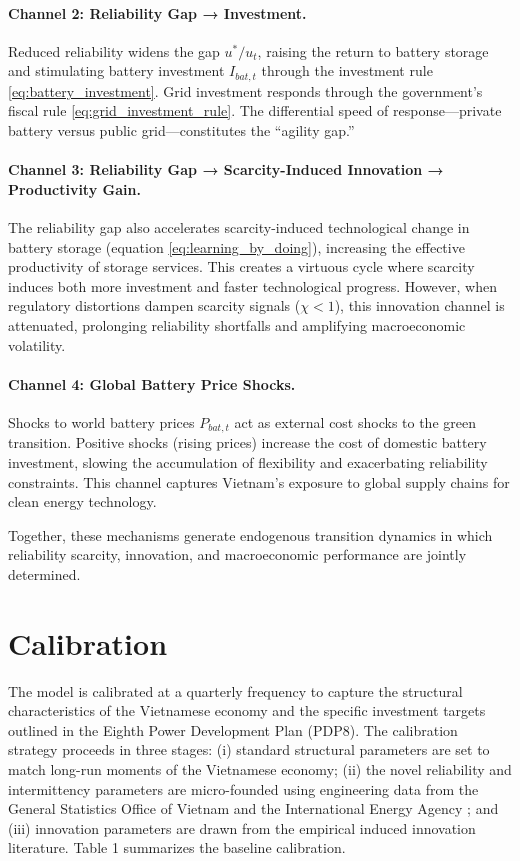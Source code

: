 \documentclass[12pt, a4paper]{article}
\begin{document}
\paragraph{Channel 2: Reliability Gap → Investment.}
Reduced reliability widens the gap $u^*/u_t$, raising the return to battery storage and stimulating battery investment $I_{bat,t}$ through the investment rule \eqref{eq:battery_investment}. Grid investment responds through the government's fiscal rule \eqref{eq:grid_investment_rule}. The differential speed of response---private battery versus public grid---constitutes the ``agility gap.''

\paragraph{Channel 3: Reliability Gap → Scarcity-Induced Innovation → Productivity Gain.}
The reliability gap also accelerates scarcity-induced technological change in battery storage (equation \eqref{eq:learning_by_doing}), increasing the effective productivity of storage services. This creates a virtuous cycle where scarcity induces both more investment and faster technological progress. However, when regulatory distortions dampen scarcity signals ($\chi < 1$), this innovation channel is attenuated, prolonging reliability shortfalls and amplifying macroeconomic volatility.

\paragraph{Channel 4: Global Battery Price Shocks.}
Shocks to world battery prices $P_{bat,t}$ act as external cost shocks to the green transition. Positive shocks (rising prices) increase the cost of domestic battery investment, slowing the accumulation of flexibility and exacerbating reliability constraints. This channel captures Vietnam's exposure to global supply chains for clean energy technology.

Together, these mechanisms generate endogenous transition dynamics in which reliability scarcity, innovation, and macroeconomic performance are jointly determined.

\section{Calibration} \label{sec:calibration}

The model is calibrated at a quarterly frequency to capture the structural characteristics of the Vietnamese economy and the specific investment targets outlined in the Eighth Power Development Plan (PDP8). The calibration strategy proceeds in three stages: (i) standard structural parameters are set to match long-run moments of the Vietnamese economy; (ii) the novel reliability and intermittency parameters are micro-founded using engineering data from the General Statistics Office of Vietnam \citep{gso2024} and the International Energy Agency \citep{iea2023}; and (iii) innovation parameters are drawn from the empirical induced innovation literature. Table 1 summarizes the baseline calibration.
\end{document}
